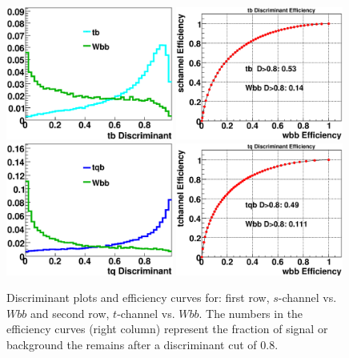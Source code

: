 \begin{figure}[!h!tbp]
\includegraphics[width=0.49\textwidth]
{eps/MatrixElement/performance/tb_Discriminant__schannel_wbb}
\includegraphics[width=0.49\textwidth]
{eps/MatrixElement/performance/tb_Efficiency__schannel_wbb}
\includegraphics[width=0.49\textwidth]
{eps/MatrixElement/performance/tq_Discriminant__tchannel_wbb}
\includegraphics[width=0.49\textwidth]
{eps/MatrixElement/performance/tq_Efficiency__tchannel_wbb}
\caption{Discriminant plots and efficiency curves for:
first row, $s$-channel vs. $Wbb$ and second row, $t$-channel
vs. $Wbb$. The numbers in the
efficiency curves (right column) represent the fraction of signal or
background the remains after a discriminant cut of 0.8.}
\label{disc_wbb}
\end{figure}

